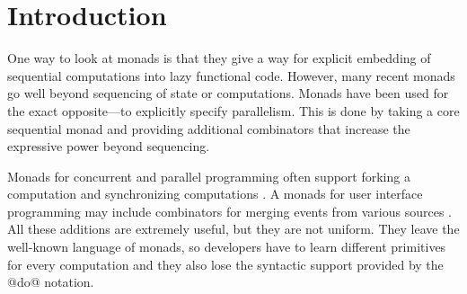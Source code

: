 \documentclass[preprint]{sigplanconf}
\begin{document}

\newcommand{\ident}[1]{{\normalfont\sffamily #1}}
\newcommand{\code}[1]{{\normalfont\ttfamily #1}}
\newcommand{\mzip}[0]{\otimes}
\newcommand{\morelse}[0]{\oplus}
\newcommand{\mzero}[0]{\text{mzero}}
\newcommand{\map}[0]{\text{map}}
\newcommand{\mduplicate}[0]{\text{mdup}}
\newcommand{\mplus}[0]{\oplus}
\newcommand{\fsharp}[0]{F$^\#$}
\newcommand{\todo}[1]{\textcolor{red}{[TODO] #1}}


\section{Introduction}
One way to look at monads is that they give a way for explicit embedding of sequential computations 
into lazy functional code. However, many recent monads go well beyond
sequencing of state or computations. Monads have been used for the exact opposite---to explicitly 
specify parallelism. This is done by taking a core sequential monad and providing additional 
combinators that increase the expressive power beyond sequencing.

Monads for concurrent \cite{poorman} and parallel programming \cite{parmonad} often 
support forking a computation and synchronizing computations \cite{chp-monad}. A monads
for user interface programming may include combinators for merging events from various sources
\cite{imperative-streams}. All these additions are extremely useful, but they are not uniform. 
They leave the well-known language of monads, so developers have to learn different primitives 
for every computation and they also lose the syntactic support provided by the @do@
notation.
\end{document}
